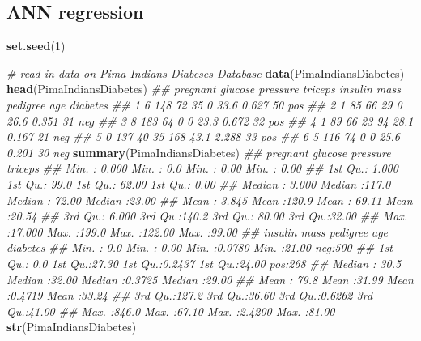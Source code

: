 \documentclass[
]{book}
\newenvironment{Shaded}{\begin{snugshade}}{\end{snugshade}}
\newcommand{\CommentTok}[1]{\textcolor[rgb]{0.56,0.35,0.01}{\textit{#1}}}
\newcommand{\DecValTok}[1]{\textcolor[rgb]{0.00,0.00,0.81}{#1}}
\newcommand{\KeywordTok}[1]{\textcolor[rgb]{0.13,0.29,0.53}{\textbf{#1}}}
\newcommand{\NormalTok}[1]{#1}
\theoremstyle{definition}
\theoremstyle{definition}
\theoremstyle{definition}
\theoremstyle{remark}
\begin{document}
\hypertarget{ann-regression}{%
\subsection{ANN regression}\label{ann-regression}}

\begin{Shaded}
\begin{Highlighting}[]
\KeywordTok{set.seed}\NormalTok{(}\DecValTok{1}\NormalTok{)}

\CommentTok{\# read in data on Pima Indians Diabeses Database}
\KeywordTok{data}\NormalTok{(PimaIndiansDiabetes)}
\KeywordTok{head}\NormalTok{(PimaIndiansDiabetes)}
\CommentTok{\#\#   pregnant glucose pressure triceps insulin mass pedigree age diabetes}
\CommentTok{\#\# 1        6     148       72      35       0 33.6    0.627  50      pos}
\CommentTok{\#\# 2        1      85       66      29       0 26.6    0.351  31      neg}
\CommentTok{\#\# 3        8     183       64       0       0 23.3    0.672  32      pos}
\CommentTok{\#\# 4        1      89       66      23      94 28.1    0.167  21      neg}
\CommentTok{\#\# 5        0     137       40      35     168 43.1    2.288  33      pos}
\CommentTok{\#\# 6        5     116       74       0       0 25.6    0.201  30      neg}
\KeywordTok{summary}\NormalTok{(PimaIndiansDiabetes)}
\CommentTok{\#\#     pregnant         glucose         pressure         triceps     }
\CommentTok{\#\#  Min.   : 0.000   Min.   :  0.0   Min.   :  0.00   Min.   : 0.00  }
\CommentTok{\#\#  1st Qu.: 1.000   1st Qu.: 99.0   1st Qu.: 62.00   1st Qu.: 0.00  }
\CommentTok{\#\#  Median : 3.000   Median :117.0   Median : 72.00   Median :23.00  }
\CommentTok{\#\#  Mean   : 3.845   Mean   :120.9   Mean   : 69.11   Mean   :20.54  }
\CommentTok{\#\#  3rd Qu.: 6.000   3rd Qu.:140.2   3rd Qu.: 80.00   3rd Qu.:32.00  }
\CommentTok{\#\#  Max.   :17.000   Max.   :199.0   Max.   :122.00   Max.   :99.00  }
\CommentTok{\#\#     insulin           mass          pedigree           age        diabetes }
\CommentTok{\#\#  Min.   :  0.0   Min.   : 0.00   Min.   :0.0780   Min.   :21.00   neg:500  }
\CommentTok{\#\#  1st Qu.:  0.0   1st Qu.:27.30   1st Qu.:0.2437   1st Qu.:24.00   pos:268  }
\CommentTok{\#\#  Median : 30.5   Median :32.00   Median :0.3725   Median :29.00            }
\CommentTok{\#\#  Mean   : 79.8   Mean   :31.99   Mean   :0.4719   Mean   :33.24            }
\CommentTok{\#\#  3rd Qu.:127.2   3rd Qu.:36.60   3rd Qu.:0.6262   3rd Qu.:41.00            }
\CommentTok{\#\#  Max.   :846.0   Max.   :67.10   Max.   :2.4200   Max.   :81.00}
\KeywordTok{str}\NormalTok{(PimaIndiansDiabetes)}

\end{Highlighting}
\end{Shaded}
\end{document}
